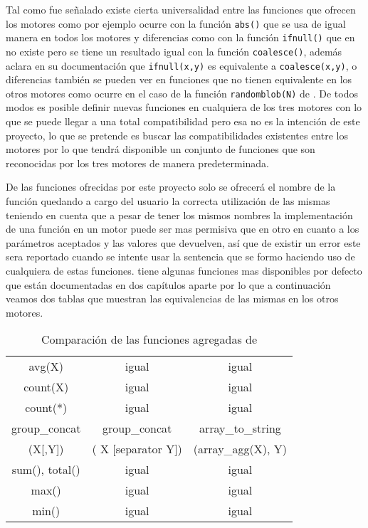 Tal como fue señalado existe cierta universalidad entre las funciones que ofrecen los motores como por ejemplo ocurre con la función \verb=abs()= que se usa de igual manera en todos los motores y diferencias como con la función \verb=ifnull()= que en \p no existe pero se tiene un resultado igual con la función \verb=coalesce()=, además \s aclara en su documentación que \verb=ifnull(x,y)= es equivalente a \verb=coalesce(x,y)=, o diferencias también se pueden ver en funciones que no tienen equivalente en los otros motores como ocurre en el caso de la función \verb=randomblob(N)= de \s. De todos modos es posible definir nuevas funciones en cualquiera de los tres motores con lo que se puede llegar a una total compatibilidad pero esa no es la intención de este proyecto, lo que se pretende es buscar las compatibilidades existentes entre los motores por lo que \jj tendrá disponible un conjunto de funciones que son reconocidas por los tres motores de manera predeterminada.

De las funciones ofrecidas por este proyecto solo se ofrecerá el nombre de la función quedando a cargo del usuario la correcta utilización de las mismas teniendo en cuenta que a pesar de tener los mismos nombres la implementación de una función en un motor puede ser mas permisiva que en otro en cuanto a los parámetros aceptados y las valores que devuelven, así que de existir un error este sera reportado cuando se intente usar la sentencia que se formo haciendo uso de cualquiera de estas funciones. \s tiene algunas funciones mas disponibles por defecto que están documentadas en dos capítulos aparte por lo que a continuación veamos dos tablas que muestran las equivalencias de las mismas en los otros motores.

\begin{table}[h]
\begin{center}
{
\selectfont
\begin{tabular}{|c|c|c|}
\hline 
\s & \m & \p \\ 
\hline 
avg(X) & igual & igual \\ 
\hline 
count(X) & igual & igual \\ 
\hline 
count(*) & igual & igual \\ 
\hline 
group\_concat & group\_concat & array\_to\_string \\ 
(X[,Y]) & ( X [separator Y]) & (array\_agg(X), Y) \\
\hline 
sum(), total() & igual & igual \\ 
\hline 
max() & igual & igual \\ 
\hline 
min() & igual & igual \\ 
\hline 
\end{tabular} 
}
\end{center}
\caption{Comparación de las funciones agregadas de \s}
\end{table}  

